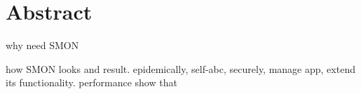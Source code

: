 \section*{Abstract}


why need SMON

how SMON looks and result. epidemically, self-abc, securely,
manage app, extend its functionality. performance show that

